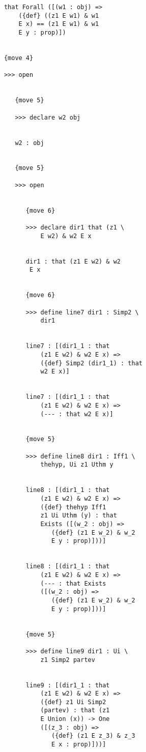 \documentclass[12pt]{article}
\begin{document}
\begin{verbatim}
            that Forall ([(w1 : obj) => 
                ({def} ((z1 E w1) & w1 
                E x) == (z1 E w1) & w1 
                E y : prop)])


            {move 4}

            >>> open


               {move 5}

               >>> declare w2 obj


               w2 : obj


               {move 5}

               >>> open


                  {move 6}

                  >>> declare dir1 that (z1 \
                      E w2) & w2 E x


                  dir1 : that (z1 E w2) & w2 
                   E x


                  {move 6}

                  >>> define line7 dir1 : Simp2 \
                      dir1


                  line7 : [(dir1_1 : that 
                      (z1 E w2) & w2 E x) => 
                      ({def} Simp2 (dir1_1) : that 
                      w2 E x)]


                  line7 : [(dir1_1 : that 
                      (z1 E w2) & w2 E x) => 
                      (--- : that w2 E x)]


                  {move 5}

                  >>> define line8 dir1 : Iff1 \
                      thehyp, Ui z1 Uthm y


                  line8 : [(dir1_1 : that 
                      (z1 E w2) & w2 E x) => 
                      ({def} thehyp Iff1 
                      z1 Ui Uthm (y) : that 
                      Exists ([(w_2 : obj) => 
                         ({def} (z1 E w_2) & w_2 
                         E y : prop)]))]


                  line8 : [(dir1_1 : that 
                      (z1 E w2) & w2 E x) => 
                      (--- : that Exists 
                      ([(w_2 : obj) => 
                         ({def} (z1 E w_2) & w_2 
                         E y : prop)]))]


                  {move 5}

                  >>> define line9 dir1 : Ui \
                      z1 Simp2 partev


                  line9 : [(dir1_1 : that 
                      (z1 E w2) & w2 E x) => 
                      ({def} z1 Ui Simp2 
                      (partev) : that (z1 
                      E Union (x)) -> One 
                      ([(z_3 : obj) => 
                         ({def} (z1 E z_3) & z_3 
                         E x : prop)]))]



\end{verbatim}
\end{document}
